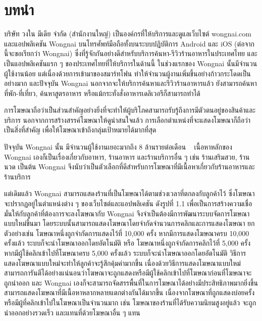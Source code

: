 \chapter{บทนำ}
\label{chapter:introduction}

บริษัท วงใน มีเดีย จำกัด (สำนักงานใหญ่) เป็นองค์กรที่ให้บริการและดูแลเว็บไซต์ wongnai.com และแอปพลิเคชัน Wongnai บนโทรศัพท์มือถือทั้งบนระบบปฏิบัติการ Android และ iOS (ต่อจากนี้จะขอเรียกว่า Wongnai) ซึ่งที่รู้จักกันอย่างดีสำหรับบริการค้นหา-รีวิวร้านอาหารในประเทศไทย และเป็นแอปพลิเคชันแรก ๆ ของประเทศไทยที่ให้บริการในด้านนี้ ในช่วงแรกของ Wongnai นั้นมีจำนวนผู้ใช้งานน้อย แต่เนื่องด้วยการเข้ามาของสมาร์ทโฟน ทำให้จำนวนผู้งานเพิ่มขึ้นอย่างก้าวกระโดดเป็นอย่างมาก และปัจจุบัน Wongnai นอกจากจะให้บริการค้นหาและรีวิวร้านอาหารแล้ว ยังสามารถค้นหาที่พัก-ที่เที่ยว, ค้นหาสูตรอาหาร หรือแม้กระทั่งสั่งอาหารเดลิเวอรีก็สามารถทำได้

การโฆษณาถือว่าเป็นส่วนสำคัญอย่างยิ่งที่จะทำให้ผู้บริโภคสามารถรับรู้ถึงการมีตัวตนอยู่ของสินค้าและบริการ นอกจากการสร้างสรรค์โฆษณาให้ดูน่าสนใจแล้ว การเลือกตำแหน่งที่จะแสดงโฆษณาก็ถือว่าเป็นสิ่งที่สำคัญ เพื่อให้โฆษณาเข้าถึงกลุ่มเป้าหมายได้มากที่สุด

ปัจจุบัน Wongnai นั้น มีจำนวนผู้ใช้งานเยอะมากถึง 8 ล้านรายต่อเดือน ~\cite{wongnai} เนื้อหาหลักของ Wongnai เองก็เป็นเรื่องเกี่ยวกับอาหาร, ร้านอาหาร และร้านบริการอื่น ๆ เช่น ร้านเสริมสวย, ร้านนวด เป็นต้น Wongnai จึงนับว่าเป็นตัวเลือกที่ดีสำหรับการโฆษณาที่มีเนื้อหาเกี่ยวกับร้านอาหารและร้านบริการ

แต่เดิมแล้ว Wongnai สามารถแสดงร้านที่เป็นโฆษณาได้ตามช่วงเวลาที่ตกลงกับลูกค้าไว้ ซึ่งโฆษณาจะปรากฏอยู่ในตำแหน่งต่าง ๆ ของเว็บไซต์และแอปพลิเคชัน ดังรูปที่ 1.1
เพื่อเป็นการสร้างความเชื่อมั่นให้กับลูกค้าที่ต้องการจะลงโฆษณากับ Wongnai จึงจำเป็นต้องมีการพัฒนาระบบจัดการโฆษณาแบบใหม่ขึ้นมา โดยระบบนั้นสามารถแสดงโฆษณาโดยจำกัดจำนวนการคลิกและการแสดงโฆษณา ยกตัวอย่างเช่น โฆษณาหนึ่งถูกจำกัดการแสดงไว้ที่ 10,000 ครั้ง หากมีการแสดงโฆษณาครบ 10,000 ครั้งแล้ว ระบบก็จะนำโฆษณาออกโดยอัตโนมัติ หรือ โฆษณาหนึ่งถูกจำกัดการคลิกไว้ที่ 5,000 ครั้ง หากมีผู้ใช้คลิกเข้าไปที่โฆษณาครบ 5,000 ครั้งแล้ว ระบบก็จะนำโฆษณาออกโดยอัตโนมัติ วิธีการแสดงโฆษณาแบบใหม่จะทำให้ลูกค้าจะรู้สึกคุ้มค่ามากขึ้น เนื่องด้วยวิธีการแสดงโฆษณาแบบใหม่สามารถการันตีได้อย่างแน่นอนว่าโฆษณาจะถูกแสดงหรือมีผู้ใช้คลิกเข้าไปที่โฆษณาก่อนที่โฆษณาจะถูกนำออก และ Wongnai เองก็จะสามารถจัดสรรพื้นที่ในการโฆษณาได้อย่างมีประสิทธิภาพมากยิ่งขึ้น สามารถแสดงโฆษณาที่มีเนื้อหาหลากหลายแตกต่างกันได้มากขึ้น เนื่องจากโฆษณาที่ถูกแสดงบ่อยครั้งหรือมีผู้ที่คลิกเข้าไปในโฆษณาเป็นจำนวนมาก เช่น โฆษณาของร้านที่ได้รับความนิยมสูงอยู่แล้ว จะถูกนำออกอย่างรวดเร็ว และแทนที่ด้วยโฆษณาอื่น ๆ แทน

